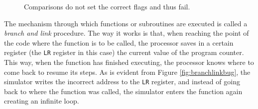 \begin{figure}[H]
	\centering
	\caption{Comparisons do not set the correct flags and thus fail.}
        \label{fig:flagbug}
\end{figure}
The mechanism through which functions or subroutines are executed is called a \emph{branch and link} procedure. The way it works is that, when reaching the point of the code where the function is to be called, the processor saves in a certain register (the \verb|LR| register in this case) the current value of the program counter. This way, when the function has finished executing, the processor knows where to come back to resume its steps. As is evident from Figure \ref{fig:branchlinkbug}, the simulator writes the incorrect address to the \verb|LR| register, and instead of going back to where the function was called, the simulator enters the function again creating an infinite loop.
